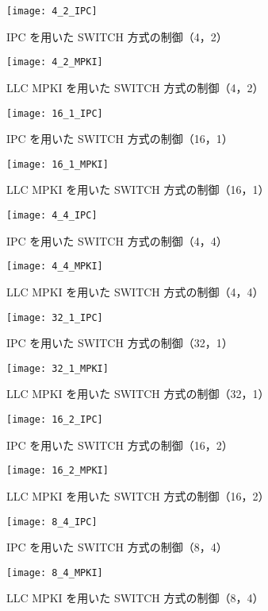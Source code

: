 \begin{figure}[tb]
  \centering
  \texttt{[image: 4\_2\_IPC]}
  \caption{IPC を用いた SWITCH 方式の制御（4，2）}
  \label{fig:4_2_IPC}

  \centering
  \texttt{[image: 4\_2\_MPKI]}
  \caption{LLC MPKI を用いた SWITCH 方式の制御（4，2）}
  \label{fig:4_2_MPKI}
\end{figure}

\begin{figure}[tb]
  \centering
  \texttt{[image: 16\_1\_IPC]}
  \caption{IPC を用いた SWITCH 方式の制御（16，1）}
  \label{fig:16_1_IPC}

  \centering
  \texttt{[image: 16\_1\_MPKI]}
  \caption{LLC MPKI を用いた SWITCH 方式の制御（16，1）}
  \label{fig:16_1_MPKI}
\end{figure}

\begin{figure}[tb]
  \centering
  \texttt{[image: 4\_4\_IPC]}
  \caption{IPC を用いた SWITCH 方式の制御（4，4）}
  \label{fig:4_4_IPC}

  \centering
  \texttt{[image: 4\_4\_MPKI]}
  \caption{LLC MPKI を用いた SWITCH 方式の制御（4，4）}
  \label{fig:4_4_MPKI}
\end{figure}

\begin{figure}[tb]
  \centering
  \texttt{[image: 32\_1\_IPC]}
  \caption{IPC を用いた SWITCH 方式の制御（32，1）}
  \label{fig:32_1_IPC}

  \centering
  \texttt{[image: 32\_1\_MPKI]}
  \caption{LLC MPKI を用いた SWITCH 方式の制御（32，1）}
  \label{fig:32_1_MPKI}
\end{figure}

\begin{figure}[tb]
  \centering
  \texttt{[image: 16\_2\_IPC]}
  \caption{IPC を用いた SWITCH 方式の制御（16，2）}
  \label{fig:16_2_IPC}

  \centering
  \texttt{[image: 16\_2\_MPKI]}
  \caption{LLC MPKI を用いた SWITCH 方式の制御（16，2）}
  \label{fig:16_2_MPKI}
\end{figure}

\begin{figure}[tb]
  \centering
  \texttt{[image: 8\_4\_IPC]}
  \caption{IPC を用いた SWITCH 方式の制御（8，4）}
  \label{fig:8_4_IPC}

  \centering
  \texttt{[image: 8\_4\_MPKI]}
  \caption{LLC MPKI を用いた SWITCH 方式の制御（8，4）}
  \label{fig:8_4_MPKI}
\end{figure}
